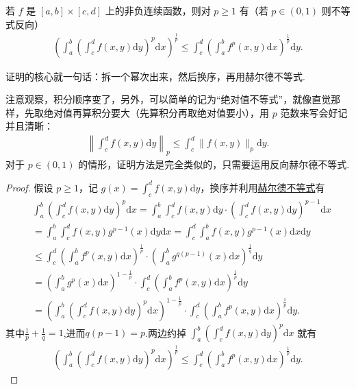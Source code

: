 \documentclass[../../main.tex]{subfiles}
\begin{document}
\begin{theorem}[Minkowski不等式]\label{theorem:Minkowski(闵可夫斯基)不等式}
若 $f$ 是 $[a,b] \times [c,d]$ 上的非负连续函数，则对 $p \geqslant 1$ 有（若 $p \in (0,1)$ 则不等式反向）
\begin{align*}
\left( \int_a^b \left( \int_c^d f(x,y) \mathrm{d}y \right)^p \mathrm{d}x \right)^{\frac{1}{p}} \leqslant \int_c^d \left( \int_a^b f^p(x,y) \mathrm{d}x \right)^{\frac{1}{p}} \mathrm{d}y.
\end{align*}
\end{theorem}
\begin{note}
证明的核心就一句话：拆一个幂次出来，然后换序，再用赫尔德不等式.
\end{note}
\begin{remark}
注意观察，积分顺序变了，另外，可以简单的记为“绝对值不等式”，就像直觉那样，先取绝对值再算积分要大（先算积分再取绝对值要小），用 $p$ 范数来写会好记并且清晰：
\begin{align*}
\left\| \int_c^d f(x,y) \mathrm{d}y \right\|_p \leqslant  \int_c^d \|f(x,y)\|_p \mathrm{d}y.
\end{align*}
对于 $p \in (0,1)$ 的情形，证明方法是完全类似的，只需要运用反向赫尔德不等式.
\end{remark}
\begin{proof}
假设 $p \geqslant  1$，记 $g(x) = \int_c^d f(x,y) \mathrm{d}y$，换序并利用\hyperref[theorem:Hold(赫尔德)不等式(积分形式)]{赫尔德不等式}有
\begin{align*}
&\int_a^b \left( \int_c^d f(x,y) \mathrm{d}y \right)^p \mathrm{d}x = \int_a^b \int_c^d f(x,y) \mathrm{d}y \cdot \left( \int_c^d f(x,y) \mathrm{d}y \right)^{p-1} \mathrm{d}x
\\
&= \int_a^b \int_c^d f(x,y) g^{p-1}(x) \mathrm{d}y \mathrm{d}x = \int_c^d \int_a^b f(x,y) g^{p-1}(x) \mathrm{d}x \mathrm{d}y
\\
&\leqslant \int_c^d \left( \int_a^b f^p(x,y) \mathrm{d}x \right)^{\frac{1}{p}} \cdot \left( \int_a^b g^{q(p-1)}(x) \mathrm{d}x \right)^{\frac{1}{q}} \mathrm{d}y
\\
&= \left( \int_a^b g^p(x) \mathrm{d}x \right)^{1-\frac{1}{p}} \cdot \int_c^d \left( \int_a^b f^p(x,y) \mathrm{d}x \right)^{\frac{1}{p}} \mathrm{d}y
\\
&= \left( \int_a^b \left( \int_c^d f(x,y) \mathrm{d}y \right)^p \mathrm{d}x \right)^{1-\frac{1}{p}} \cdot \int_c^d \left( \int_a^b f^p(x,y) \mathrm{d}x \right)^{\frac{1}{p}} \mathrm{d}y.
\end{align*}
其中$\frac{1}{p}+\frac{1}{q}=1$,进而$q(p-1)=p$.两边约掉 $\int_a^b \left( \int_c^d f(x,y) \mathrm{d}y \right)^p \mathrm{d}x$ 就有
\begin{align*}
\left( \int_a^b \left( \int_c^d f(x,y) \mathrm{d}y \right)^p \mathrm{d}x \right)^{\frac{1}{p}} \leqslant \int_c^d \left( \int_a^b f^p(x,y) \mathrm{d}x \right)^{\frac{1}{p}} \mathrm{d}y.
\end{align*}

\end{proof}
\end{document}
